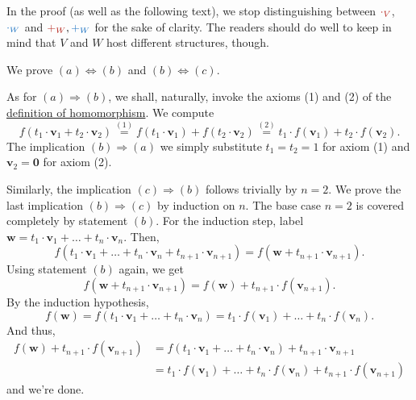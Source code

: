 \begin{lemproof}
 In the proof (as well as the following text), we stop distinguishing between
 $\clr{ \cdot _V}$, $\clb{ \cdot _W}$ and $\clr{+_W},\clb{+_W}$ for the sake of
 clarity. The readers should do well to keep in mind that $V$ and $W$ host
 different structures, though.

 We prove $(a) \Leftrightarrow (b)$ and $(b) \Leftrightarrow (c)$.

 As for $(a) \Rightarrow (b)$, we shall, naturally, invoke the axioms (1) and
 (2) of the \hyperref[def:homomorphism]{definition of homomorphism}. We compute
 \[
  f(t_1 \cdot \mathbf{v}_1 + t_2 \cdot \mathbf{v}_2) \overset{(1)}{=} f(t_1
  \cdot \mathbf{v}_1) + f(t_2 \cdot \mathbf{v}_2) \overset{(2)}{=} t_1 \cdot
  f(\mathbf{v}_1) + t_2 \cdot f(\mathbf{v}_2).
 \]
 The implication $(b) \Rightarrow (a)$ we simply substitute $t_1 = t_2 = 1$ for
 axiom (1) and $\mathbf{v}_2 = \mathbf{0}$ for axiom (2).

 Similarly, the implication $(c) \Rightarrow (b)$ follows trivially by $n = 2$.
 We prove the last implication $(b) \Rightarrow (c)$ by induction on $n$. The
 base case $n = 2$ is covered completely by statement $(b)$. For the induction
 step, label $\mathbf{w} = t_1 \cdot \mathbf{v}_1 + \ldots + t_n \cdot
 \mathbf{v}_n$. Then,
 \[
  f(t_1 \cdot \mathbf{v}_1 + \ldots + t_n \cdot \mathbf{v}_n + t_{n+1} \cdot
  \mathbf{v}_{n+1}) = f(\mathbf{w} + t_{n+1} \cdot \mathbf{v}_{n+1}).
 \]
 Using statement $(b)$ again, we get
 \[
  f(\mathbf{w} + t_{n+1} \cdot \mathbf{v}_{n+1}) = f(\mathbf{w}) + t_{n+1} \cdot
  f(\mathbf{v}_{n+1}).
 \]
 By the induction hypothesis,
 \[
  f(\mathbf{w}) = f(t_1 \cdot \mathbf{v}_1 + \ldots + t_n \cdot \mathbf{v}_n) =
  t_1 \cdot f(\mathbf{v}_1) + \ldots + t_n \cdot f(\mathbf{v}_n).
 \]
 And thus,
 \begin{align*}
  f(\mathbf{w}) + t_{n+1} \cdot f(\mathbf{v}_{n+1}) &= f(t_1 \cdot \mathbf{v}_1 +
  \ldots + t_n \cdot \mathbf{v}_n) + t_{n+1} \cdot \mathbf{v}_{n+1}\\
                                                    &= t_1 \cdot
  f(\mathbf{v}_{1}) + \ldots + t_n \cdot f(\mathbf{v}_n) + t_{n+1} \cdot
  f(\mathbf{v}_{n+1})
 \end{align*}
 and we're done.
\end{lemproof}

